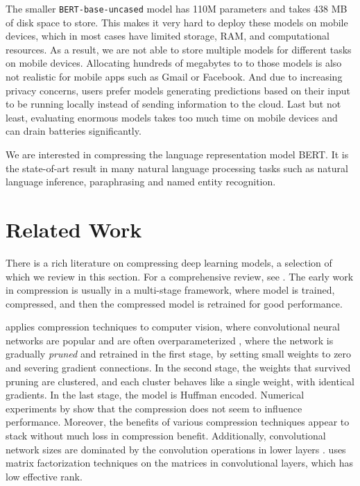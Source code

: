\documentclass[10pt]{article}
\begin{document}
The smaller \texttt{BERT-base-uncased} model has 110M parameters and takes
438 MB of disk space to store. This
makes it very hard to deploy these models on mobile devices, which in most
cases have limited storage, RAM, and computational resources. As a
result, we are not able to store multiple models for different tasks on mobile
devices. Allocating hundreds of megabytes to to those models is also not
realistic for mobile apps such as Gmail or Facebook. And due to increasing
privacy concerns, users prefer models generating predictions based on their
input to be running locally instead of sending information to the cloud. Last
but not least, evaluating enormous models takes too much time on mobile
devices and can drain batteries significantly.

We are interested in compressing the language representation model BERT.  It is the state-of-art result in many natural
language processing tasks  such as natural language inference, paraphrasing
and named entity recognition.


\section{Related Work}

There is a rich literature on compressing deep learning models, a selection
of which we review in this section. For a comprehensive review, see  
\citep{cheng2017survey}. The early work in compression is usually in a
multi-stage framework, where model is trained, compressed, and then
the compressed model is retrained for good performance. 

\citet{han2015deep} applies compression techniques to computer vision, where
convolutional neural networks are popular and are often overparameterized
\citep{yang2019fsnet}, where the network is gradually \emph{pruned} and
retrained in the first stage, by setting small weights to zero and severing
gradient connections. In the second stage, the weights that survived pruning are
clustered, and each cluster behaves like a single weight, with identical
gradients. In the last stage, the model is Huffman encoded. Numerical
experiments by \citet{han2015deep} show that the compression does not seem to
influence performance. Moreover, the benefits of various compression techniques
appear to stack without much loss in compression benefit. Additionally,
convolutional network sizes are dominated by the convolution operations in lower
layers \citep{denton2014exploiting}. \citet{denton2014exploiting} uses matrix
factorization techniques on the matrices in convolutional layers, which has low
effective rank.
\end{document}

